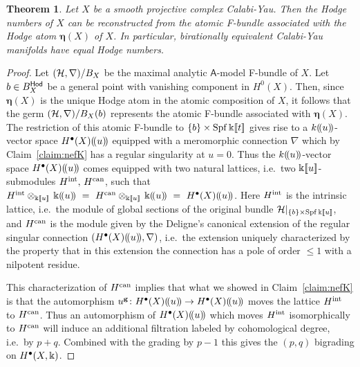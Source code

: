 \documentclass[twoside,leqno]{article}
\numberwithin{equation}{section}
\theoremstyle{plain}
\newtheorem{theorem}[equation]{Theorem}
\theoremstyle{definition}
\begin{document}
\begin{theorem} \label{thm:two.norms}
Let $X$ be a smooth projective complex Calabi-Yau. Then the Hodge numbers of $X$ can be reconstructed from the atomic F-bundle associated with the Hodge atom $\boldsymbol{\eta}(X)$ of $X$.
In particular, birationally equivalent Calabi-Yau manifolds have equal Hodge numbers.
\end{theorem}
\begin{proof}
Let $(\mathcal H,\nabla)/B_{X}$ be the maximal analytic $\mathsf{A}$-model F-bundle of $X$. 
Let $b \in B_{X}^{\mathsf{Hod}}$ be a general point with vanishing component in $H^0(X)$. Then, since $\boldsymbol{\eta}(X)$ is the unique Hodge atom in the atomic composition of $X$, it follows that the germ $(\mathcal H,\nabla)/B_{X}(b)$ represents the atomic F-bundle associated with 
$\boldsymbol{\eta}(X)$.  The restriction of this atomic F-bundle 
to $\{b\}\times \operatorname{Spf} \Bbbk[\![t]\!]$ gives rise to a $k(\!(u)\!)$-vector space $H^{\bullet}(X)(\!(u)\!)$ equipped with a meromorphic connection $\nabla$ which by Claim~\ref{claim:nefK} has a regular singularity at $u=0$. 
Thus the $k(\!(u)\!)$-vector space $H^{\bullet}(X)(\!(u)\!)$ comes equipped with two natural lattices, i.e.\ two $\Bbbk[\![u]\!]$-submodules $H^{\operatorname{int}}, \, H^{\operatorname{can}}$, such that 
$H^{\op{int}}\otimes_{\bbk\dbb{u}} \, \bbk\dbp{u} \ = \ H^{\op{can}} \otimes_{\bbk\dbb{u}} \,  \bbk\dbp{u} \ = \ H^{\bullet}(X)\dbp{u}$. Here  $H^{\operatorname{int}}$ is the intrinsic lattice, i.e.\ the module of global sections of the original bundle $\mathcal H|_{\{b\}\times \operatorname{Spf} \Bbbk[\![u]\!]}$, and 
$H^{\operatorname{can}}$ is the module given by the Deligne's canonical extension \cite{Deligne-de,Deligne-canext}
of the regular singular connection $(H^{\bullet}(X)(\!(u)\!),\nabla)$, i.e.\ the extension uniquely characterized by the property that in this extension the connection has a pole of order $\leq 1$ with a nilpotent residue. 

This characterization of $H^{\operatorname{can}}$ implies that what we showed in 
Claim~\ref{claim:nefK} is  that the automorphism $u^{\mathbf{g}} \colon 
H^{\bullet}(X)(\!(u)\!) \to H^{\bullet}(X)(\!(u)\!)$ moves the lattice $H^{\operatorname{int}}$ to
$H^{\operatorname{can}}$. Thus an automorphism of $H^{\bullet}(X)(\!(u)\!)$ which moves $H^{\operatorname{int}}$ isomorphically to
$H^{\operatorname{can}}$ will induce an additional filtration  labeled by cohomological degree, i.e.\ by 
$p+q$. Combined with the grading by $p-1$ this gives the $(p,q)$ bigrading on $H^{\bullet}(X,\Bbbk)$. 
\end{proof}
\end{document}

